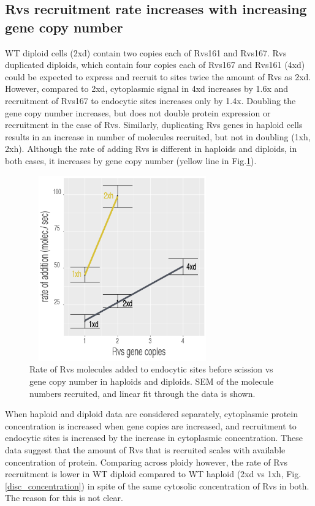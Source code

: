 \subsection{Rvs recruitment rate increases with increasing gene copy number}
WT diploid cells (2xd) contain two copies each of Rvs161 and Rvs167. Rvs duplicated diploids, which contain four copies each of Rvs167 and Rvs161 (4xd) could be expected to express and recruit to sites twice the amount of Rvs as 2xd. However, compared to 2xd, cytoplasmic signal in 4xd increases by 1.6x and recruitment of Rvs167 to endocytic sites increases only by 1.4x. Doubling the gene copy number increases, but does not double protein expression or recruitment in the case of Rvs. Similarly, duplicating Rvs genes in haploid cells results in an increase in number of molecules recruited, but not in doubling (1xh, 2xh). Although the rate of adding Rvs is different in haploids and diploids, in both cases, it increases by gene copy number (yellow line in Fig.\ref{disc_recruit_rate}). 

	\begin{figure}[H]
	\centering
	\hspace{-1cm}
	\includegraphics[width=8cm,height=8cm,keepaspectratio]{figures/discussion/recruit_rate_final}
	\caption[Rate of recruitment of Rvs]
{Rate of Rvs molecules added to endocytic sites before scission vs gene copy number in haploids and diploids. SEM of the molecule numbers recruited, and linear fit through the data is shown.
	\label{disc_recruit_rate}}
\end{figure}

	\vspace{5mm}
When haploid and diploid data are considered separately, cytoplasmic protein concentration is increased when gene copies are increased, and recruitment to endocytic sites is increased by the increase in cytoplasmic concentration. These data suggest that the amount of Rvs that is recruited scales with available concentration of protein. Comparing across ploidy however, the rate of Rvs recruitment is lower in WT diploid compared to WT haploid (2xd vs 1xh, Fig.\ref{disc_concentration}) in spite of the same cytosolic concentration of Rvs in both. The reason for this is not clear. 


